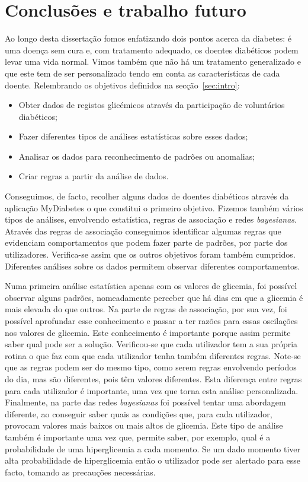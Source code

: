 \chapter{Conclusões e trabalho futuro}\label{chap:conc}

Ao longo desta dissertação fomos enfatizando dois pontos acerca da diabetes: é uma doença sem cura e, com tratamento adequado, os doentes diabéticos podem levar uma vida normal. Vimos também que não há um tratamento generalizado e que este tem de ser personalizado tendo em conta as características de cada doente. Relembrando os objetivos definidos na secção~\ref{sec:intro}:

\begin{itemize}
	\item Obter dados de registos glicémicos através da participação de voluntários diabéticos;
	\item Fazer diferentes tipos de análises estatísticas sobre esses dados;
	\item Analisar os dados para reconhecimento de padrões ou anomalias;
	\item Criar regras a partir da análise de dados.

\end{itemize}
Conseguimos, de facto, recolher alguns dados de doentes diabéticos através da aplicação MyDiabetes o que constitui o primeiro objetivo. Fizemos também vários tipos de análises, envolvendo estatística, regras de associação e redes \textit{bayesianas}. Através das regras de associação conseguimos identificar algumas regras que evidenciam comportamentos que podem fazer parte de padrões, por parte dos utilizadores. Verifica-se assim que os outros objetivos foram também cumpridos. Diferentes análises sobre os dados permitem observar diferentes comportamentos.

Numa primeira análise estatística apenas com os valores de glicemia, foi possível observar alguns padrões, nomeadamente perceber que há dias em que a glicemia é mais elevada do que outros. Na parte de regras de associação, por sua vez, foi possível aprofundar esse conhecimento e passar a ter razões para essas oscilações nos valores de glicemia. Este conhecimento é importante porque assim permite saber qual pode ser a solução. Verificou-se que cada utilizador tem a sua própria rotina o que faz com que cada utilizador tenha também diferentes regras. Note-se que as regras podem ser do mesmo tipo, como serem regras envolvendo períodos do dia, mas são diferentes, pois têm valores diferentes. Esta diferença entre regras para cada utilizador é importante, uma vez que torna esta análise personalizada. Finalmente, na parte das redes \textit{bayesianas} foi possível tentar uma abordagem diferente, ao conseguir saber quais as condições que, para cada utilizador, provocam valores mais baixos ou mais altos de glicemia. Este tipo de análise também é importante uma vez que, permite saber, por exemplo, qual é a probabilidade de uma hiperglicemia a cada momento. Se um dado momento tiver alta probabilidade de hiperglicemia então o utilizador pode ser alertado para esse facto, tomando as precauções necessárias. 

